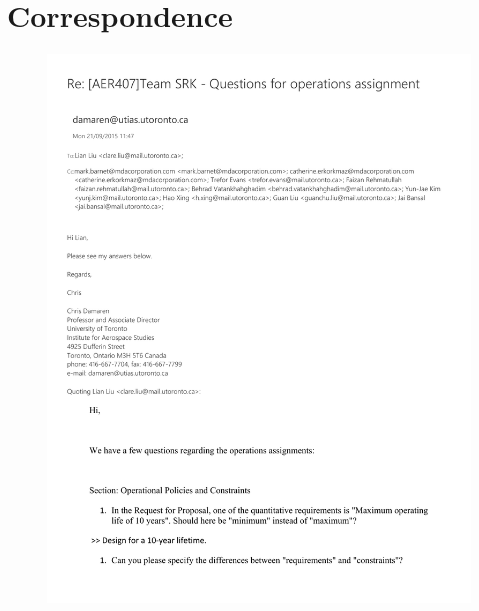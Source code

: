 \documentclass[12pt, letter]{article}
\begin{document}
\section{Correspondence}
\label{email}
\begin{figure}[H]
\includegraphics[height=\textheight]{email}
\end{figure}
\end{document}
